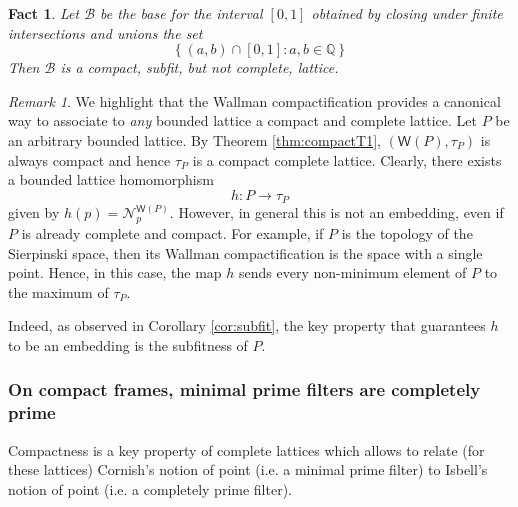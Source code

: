 \documentclass{article}
\newcommand{\opencorn}[2]{\mathcal{N}^{\mathsf{W}(#1)}_{#2}}
\newcommand{\corn}[1]{(\mathsf{W}(#1),\tau_{#1})}
\theoremstyle{plain}
\newtheorem{fact}[theorem]{Fact}
\theoremstyle{definition}
\theoremstyle{remark}
\newtheorem{remark}[theorem]{Remark}
\newcommand{\bp}[1]{\left\lbrace #1 \right\rbrace}
\newcommand{\0}{\mathbbm 0}
\newcommand{\1}{\mathbbm 1}
\newcommand{\2}{\mathbbm 2}
\begin{document}
\begin{fact}
\label{fact:compactnotcomplete}
Let \( \mathcal{B} \) be the base for the interval \([0,1]\) obtained by closing under finite intersections and unions the set
\[
\bp{(a,b) \cap [0,1]: a,b \in \mathbb{Q}} 
\]
Then \( \mathcal{B} \) is a compact, subfit, but not complete, lattice.

\end{fact}

\begin{remark}
We highlight that the Wallman compactification provides a canonical way to associate to \emph{any} bounded lattice a  compact and complete lattice. Let \(P\) be an arbitrary bounded lattice. By Theorem \ref{thm:compactT1}, $\corn{P}$ is always compact and hence \(\tau_P\) is a compact complete lattice. Clearly, there exists a bounded lattice homomorphism \[h: P \to \tau_P\] given by \(h(p)=\opencorn{P}{p}.\) However, in general this is not an embedding, even if \(P\) is already complete and compact. For example, if \(P\) is the topology of the Sierpinski space, then its Wallman compactification is the space with a single point. Hence, in this case, the map \(h\) sends every non-minimum element of \(P\) to the maximum of \(\tau_P\).

Indeed, as observed in Corollary \ref{cor:subfit}, the key property that guarantees \(h\) to be an embedding is the subfitness of  \(P\).
\end{remark}









\subsubsection{On compact frames, minimal prime filters are completely prime}
Compactness is a key property of complete lattices which allows to relate (for these lattices) Cornish's notion of point (i.e. a minimal prime filter) to Isbell's notion of point (i.e. a completely prime filter). 
\end{document}
